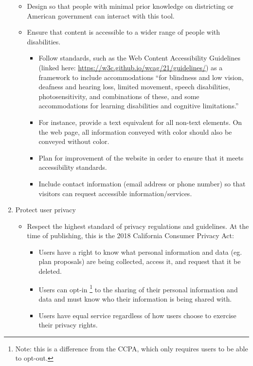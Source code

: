 \documentclass{mgggarticle}
\begin{document}
\begin{enumerate}
  \begin{itemize}
      \item Design so that people with minimal prior knowledge on districting or American government can interact with this tool.
      \item Ensure that content is accessible to a wider range of people with disabilities. 
      \begin{itemize}
          \item Follow standards, such as the Web Content Accessibility Guidelines (linked here: \url{https://w3c.github.io/wcag/21/guidelines/}) as a framework to include accommodations “for blindness and low vision, deafness and hearing loss, limited movement, speech disabilities, photosensitivity, and combinations of these, and some accommodations for learning disabilities and cognitive limitations.” 
          \item For instance, provide a text equivalent for all non-text elements. On the web page, all information conveyed with color should also be conveyed without color. 
          \item Plan for improvement of the website in order to ensure that it meets accessibility standards. 
          \item Include contact information (email address or phone number) so that visitors can request accessible information/services.

      \end{itemize}
  \end{itemize}
  \item Protect user privacy
  \begin{itemize}
      \item Respect the highest standard of privacy regulations and guidelines. At the time of publishing, this is the 2018 California Consumer Privacy Act: 
      \begin{itemize}
          \item Users have a right to know what personal information and data (eg. plan proposals) are being collected, access it, and request that it be deleted. 
          \item Users can opt-in \footnote{ Note: this is a difference from the CCPA, which only requires users to be able to opt-out.} to the sharing of their personal information and data and must know who their information is being shared with.
          \item Users have equal service regardless of how users choose to exercise their privacy rights.



\end{itemize}
\end{itemize}
\end{enumerate}
\end{document}
